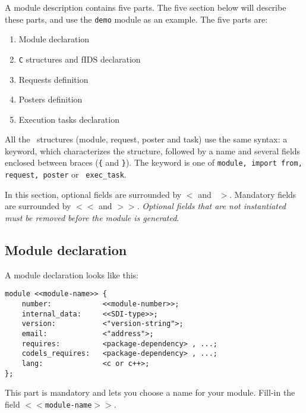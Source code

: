 A  module description contains five   parts. The five section below  will
describe these parts, and use the {\tt demo} module as an example.
The five parts are:

\begin{enumerate}
\item Module declaration
\item {\tt C} structures and fIDS declaration
\item Requests definition
\item Posters definition
\item Execution tasks declaration
\end{enumerate}

All the  \GenoM\ structures (module,  request, poster  and task) use  the
same syntax: a keyword, which characterizes the  structure, followed by a
name and several fields enclosed between  braces ({\tt \{} and {\tt \}}).
The keyword is one of {\tt module, import  from, request, poster} or {\tt
exec\_task}.

In this section, optional  fields are  surrounded  by {\tt $<$} and  {\tt
$>$}. Mandatory fields are surrounded by  {\tt $<<$} and {\tt $>>$}. {\em
Optional   fields that are not  instantiated  must  be removed before the
module is generated}.

\subsection{Module declaration}

A module declaration looks like this:

\begin{center}\begin{cartouche}\small\begin{verbatim}
module <<module-name>> {
    number:            <<module-number>>;
    internal_data:     <<SDI-type>>;
    version:           <"version-string">;
    email:             <"address">;
    requires:          <package-dependency> , ...;
    codels_requires:   <package-dependency> , ...;
    lang:              <c or c++>;
};
\end{verbatim}\end{cartouche}\end{center}


This part   is  mandatory  and    lets   you  choose a  name   for   your
module.  Fill-in the field  {\tt $<<$module-name$>>$}.

